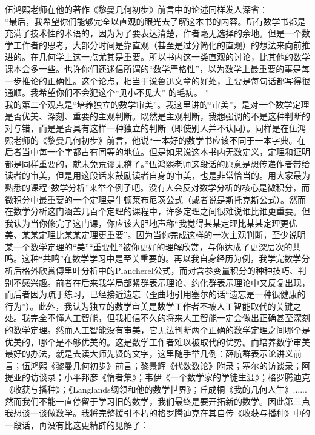 \documentclass[a4paper,11pt,notitlepage]{article}
\begin{document}
\indent 伍鸿熙老师在他的著作《黎曼几何初步》前言中的论述同样发人深省：\\
\indent “最后，我希望你们能够完全以直观的眼光去了解这本书的内容。所有数学书都是充满了技术性的术语的，因为为了要表达清楚，作者毫无选择的余地。但是一个数学工作者的思考，大部分时间是靠直观（甚至是过分简化的直观）的想法来向前推进的。在几何学上这一点尤其是重要。所以书内这一类直观的讨论，比其他的数学课本会多一些。也许你们还迷信所谓的“数学严格性”，以为数学上最重要的事是每一步推论的正确性。这个论点，相当于说鲁迅文章的好处，主要是每句话都写得很通顺。我希望你们不会犯这个“见小不见大” 的毛病。 ”\\
\indent 我的第二个观点是“培养独立的数学审美”。我这里讲的“审美”，是对一个数学定理是否优美、深刻、重要的主观判断。既然是主观判断，我想强调的不是这种判断的对与错，而是是否具有这样一种独立的判断（即使别人并不认同）。同样是在伍鸿熙老师的《黎曼几何初步》前言，他说“一本好的数学书应该不同于一本字典。在后者当中每一个字都占有同等的地位。但是如果说这本书内无数定义，定理和证明都是同样重要的，就未免荒谬无稽了。”伍鸿熙老师这段话的原意是想传递作者带给读者的审美，但是用这段话来鼓励读者自身的审美，也是非常恰当的。用大家最为熟悉的课程“数学分析”来举个例子吧。没有人会反对数学分析的核心是微积分，而微积分中最重要的一个定理是牛顿莱布尼茨公式（或者说是斯托克斯公式）。然而在数学分析这门涵盖几百个定理的课程中，许多定理之间很难说谁比谁更重要。但我认为当你修完了这门课，你应该大胆地声称“我觉得某某定理比某某定理更优美、某某定理比某某定理更重要”。因为当你完成这样的一次主观判断，至少说明某一个数学定理的“美”“重要性”被你更好的理解欣赏，与你达成了更深层次的共鸣。这种“共鸣”在数学学习中是至关重要的。再以我自身经历为例，我学完数学分析后格外欣赏傅里叶分析中的Plancherel公式，而对含参变量积分的种种技巧、判别不感兴趣。前者在后来我学局部紧群表示理论、约化群表示理论中又反复出现，而后者因为疏于练习，已经接近遗忘（歪曲地引用塞尔的话“遗忘是一种很健康的行为”）。此外，我认为独立的数学审美是数学工作者不被人工智能取代的关键之处。我完全不懂人工智能，但我相信不久的将来人工智能一定会做出正确甚至深刻的数学定理。然而人工智能没有审美，它无法判断两个正确的数学定理之间哪个是优美的，哪个是不够优美的。这是数学工作者难以被取代的优势。而培养数学审美最好的办法，就是去读大师先贤的文字，这里随手举几例：薛航群表示论讲义前言；伍鸿熙《黎曼几何初步》前言；黎景辉《代数数论》附录；塞尔的访谈录；阿提亚的访谈录；小平邦彦《惰者集》；韦伊《一个数学家的学徒生涯》；格罗腾迪克《收获与播种》；《Langlands纲领和他的数学世界》；丘成桐《我的几何人生》......\\
\indent 然而我们不能一直停留于学习旧的数学，我们最终是要开拓新的数学。因此第三点我想谈一谈做数学。我将完整援引不朽的格罗腾迪克在其自传《收获与播种》中的一段话，再没有比这更精辟的见解了：\\
\end{document}
